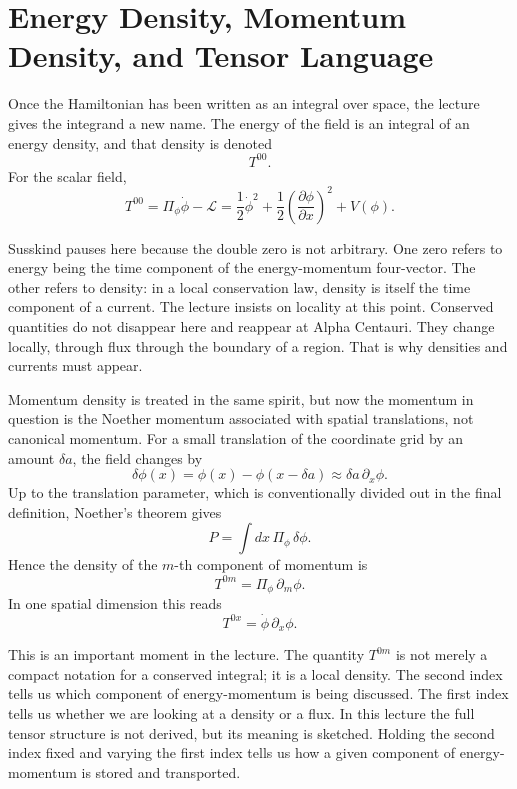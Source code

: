 \section{Energy Density, Momentum Density, and Tensor Language}

Once the Hamiltonian has been written as an integral over space, the lecture gives the integrand a new name. The energy of the field is an integral of an energy density, and that density is denoted
\begin{equation}
T^{00}.
\end{equation}
For the scalar field,
\begin{equation}
T^{00}=\Pi_\phi\dot\phi-\mathcal L
=\frac12\dot\phi^2+\frac12\left(\frac{\partial\phi}{\partial x}\right)^2+V(\phi).
\end{equation}

Susskind pauses here because the double zero is not arbitrary. One zero refers to energy being the time component of the energy-momentum four-vector. The other refers to density: in a local conservation law, density is itself the time component of a current. The lecture insists on locality at this point. Conserved quantities do not disappear here and reappear at Alpha Centauri. They change locally, through flux through the boundary of a region. That is why densities and currents must appear.

Momentum density is treated in the same spirit, but now the momentum in question is the Noether momentum associated with spatial translations, not canonical momentum. For a small translation of the coordinate grid by an amount \(\delta a\), the field changes by
\begin{equation}
\delta\phi(x)=\phi(x)-\phi(x-\delta a)\approx \delta a\,\partial_x\phi.
\end{equation}
Up to the translation parameter, which is conventionally divided out in the final definition, Noether's theorem gives
\begin{equation}
P=\int dx\,\Pi_\phi\,\delta\phi.
\end{equation}
Hence the density of the \(m\)-th component of momentum is
\begin{equation}
T^{0m}=\Pi_\phi\,\partial_m\phi.
\end{equation}
In one spatial dimension this reads
\begin{equation}
T^{0x}=\dot\phi\,\partial_x\phi.
\end{equation}

This is an important moment in the lecture. The quantity \(T^{0m}\) is not merely a compact notation for a conserved integral; it is a local density. The second index tells us which component of energy-momentum is being discussed. The first index tells us whether we are looking at a density or a flux. In this lecture the full tensor structure is not derived, but its meaning is sketched. Holding the second index fixed and varying the first index tells us how a given component of energy-momentum is stored and transported.

